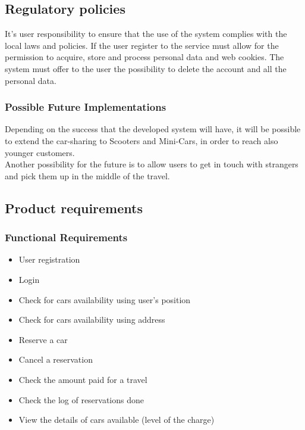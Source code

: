 \subsection{Regulatory policies}
It’s user responsibility to ensure that the use of the system complies with the local laws and policies. If the user register to the service must allow for the permission to acquire, store and process personal data and web cookies. The system must offer to the user the possibility to delete the account and all the personal data.


\subsubsection{Possible Future Implementations}
Depending on the success that the developed system will have, it will be possible to extend the car-sharing to Scooters and Mini-Cars, in order to reach also younger customers.
\\ \noindent 
Another possibility for the future is to allow users to get in touch with strangers and pick them up in the middle of the travel.
\pagebreak{}

\subsection{Product requirements}
\subsubsection{Functional Requirements}

\begin{itemize}
	\item User registration
	\item Login
	\item Check for cars availability using user's position
	\item Check for cars availability using address
	\item Reserve a car
	\item Cancel a reservation
	\item Check the amount paid for a travel
	\item Check the log of reservations done
	\item View the details of cars available (level of the charge)
	
	
\end{itemize}


